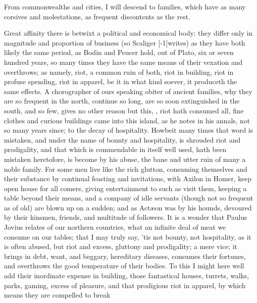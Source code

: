 From commonwealths and cities, I will descend to families, which have
as many corsives and molestations, as frequent discontents as the rest.

Great affinity there is betwixt a political and economical body; they
differ only in magnitude and proportion of business (so Scaliger
[-1\baselineskip]writes) as they have both likely the same period, as Bodin
and Peucer hold, out of Plato, six or seven hundred years, so many
times they have the same means of their vexation and overthrows; as
namely, riot, a common ruin of both, riot in building, riot in profuse
spending, riot in apparel, \etc{} be it in what kind soever, it produceth
the same effects. A chorographer of ours speaking obiter of
ancient families, why they are so frequent in the north, continue so
long, are so soon extinguished in the south, and so few, gives no other
reason but this, , riot hath consumed all, fine
clothes and curious buildings came into this island, as he notes in his
annals, not so many years since;  to
the decay of hospitality. Howbeit many times that word is mistaken, and
under the name of bounty and hospitality, is shrouded riot and
prodigality, and that which is commendable in itself well used, hath
been mistaken heretofore, is become by his abuse, the bane and utter
ruin of many a noble family. For some men live like the rich glutton,
consuming themselves and their substance by continual feasting and
invitations, with Axilon in Homer, keep open house for all comers,
giving entertainment to such as visit them, keeping a table beyond
their means, and a company of idle servants (though not so frequent as
of old) are blown up on a sudden; and as Act\ae{}on was by his hounds,
devoured by their kinsmen, friends, and multitude of followers. It
is a wonder that Paulus Jovius relates of our northern countries, what
an infinite deal of meat we consume on our tables; that I may truly
say, 'tis not bounty, not hospitality, as it is often abused, but riot
and excess, gluttony and prodigality; a mere vice; it brings in debt,
want, and beggary, hereditary diseases, consumes their fortunes, and
overthrows the good temperature of their bodies. To this I might here
well add their inordinate expense in building, those fantastical
houses, turrets, walks, parks, \etc{} gaming, excess of pleasure, and that
prodigious riot in apparel, by which means they are compelled to break
